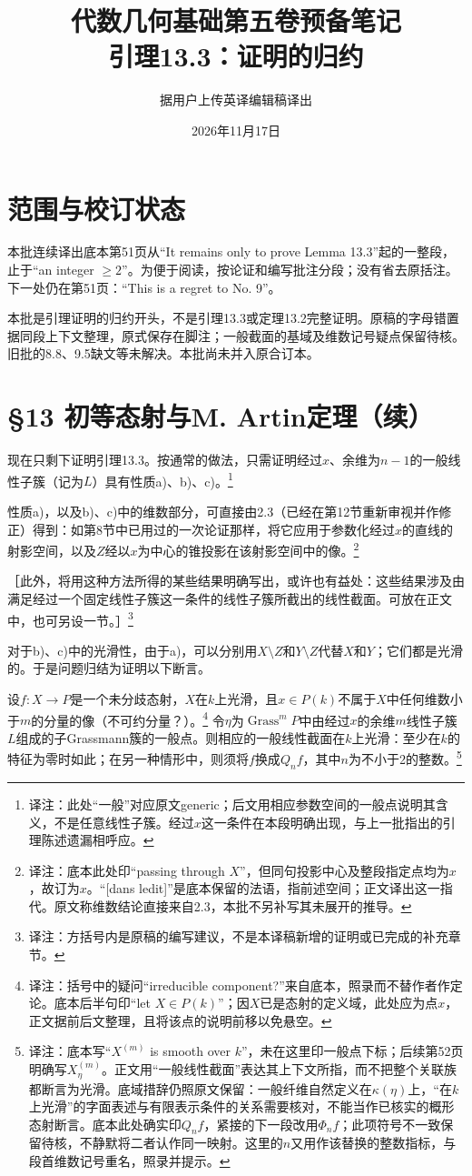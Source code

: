\documentclass[openany,fontset=fandol]{ctexbook}
\newcommand{\note}[1]{\footnote{译注：#1}}
\begin{document}
\title{代数几何基础第五卷预备笔记\\引理13.3：证明的归约}
\author{据用户上传英译编辑稿译出}
\date{2026年11月17日}
\maketitle
\chapter*{范围与校订状态}
本批连续译出底本第51页从“It remains only to prove Lemma 13.3”起的一整段，止于“an integer $\geq2$”。为便于阅读，按论证和编写批注分段；没有省去原括注。下一处仍在第51页：“This is a regret to No. 9”。

本批是引理证明的归约开头，不是引理13.3或定理13.2完整证明。原稿的字母错置据同段上下文整理，原式保存在脚注；一般截面的基域及维数记号疑点保留待核。旧批的8.8、9.5缺文等未解决。本批尚未并入原合订本。
\chapter*{§13 初等态射与M. Artin定理（续）}
现在只剩下证明引理13.3。按通常的做法，只需证明经过$x$、余维为$n-1$的一般线性子簇（记为$L$）具有性质a)、b)、c)。\note{此处“一般”对应原文generic；后文用相应参数空间的一般点说明其含义，不是任意线性子簇。经过$x$这一条件在本段明确出现，与上一批指出的引理陈述遗漏相呼应。}

性质a)，以及b)、c)中的维数部分，可直接由2.3（已经在第12节重新审视并作修正）得到：如第8节中已用过的一次论证那样，将它应用于参数化经过$x$的直线的射影空间，以及$Z$经以$x$为中心的锥投影在该射影空间中的像。\note{底本此处印“passing through $X$”，但同句投影中心及整段指定点均为$x$，故订为$x$。“[dans ledit]”是底本保留的法语，指前述空间；正文译出这一指代。原文称维数结论直接来自2.3，本批不另补写其未展开的推导。}

［此外，将用这种方法所得的某些结果明确写出，或许也有益处：这些结果涉及由满足经过一个固定线性子簇这一条件的线性子簇所截出的线性截面。可放在正文中，也可另设一节。］\note{方括号内是原稿的编写建议，不是本译稿新增的证明或已完成的补充章节。}

对于b)、c)中的光滑性，由于a)，可以分别用$X\setminus Z$和$Y\setminus Z$代替$X$和$Y$；它们都是光滑的。于是问题归结为证明以下断言。

\newpage
设$f:X\to P$是一个未分歧态射，$X$在$k$上光滑，且$x\in P(k)$不属于$X$中任何维数小于$m$的分量的像（不可约分量？）。\note{括号中的疑问“irreducible component?”来自底本，照录而不替作者作定论。底本后半句印“let $X\in P(k)$”；因$X$已是态射的定义域，此处应为点$x$，正文据前后文整理，且将该点的说明前移以免悬空。}
令$\eta$为$\operatorname{Grass}^{m}P$中由经过$x$的余维$m$线性子簇$L$组成的子Grassmann簇的一般点。则相应的一般线性截面在$k$上光滑：至少在$k$的特征为零时如此；在另一种情形中，则须将$f$换成$Q_n f$，其中$n$为不小于2的整数。\note{底本写“$X^{(m)}$ is smooth over $k$”，未在这里印一般点下标；后续第52页明确写$X^{(m)}_\eta$。正文用“一般线性截面”表达其上下文所指，而不把整个关联族都断言为光滑。底域措辞仍照原文保留：一般纤维自然定义在$\kappa(\eta)$上，“在$k$上光滑”的字面表述与有限表示条件的关系需要核对，不能当作已核实的概形态射断言。底本此处确实印$Q_n f$，紧接的下一段改用$\Phi_n f$；此项符号不一致保留待核，不静默将二者认作同一映射。这里的$n$又用作该替换的整数指标，与段首维数记号重名，照录并提示。}
\end{document}
